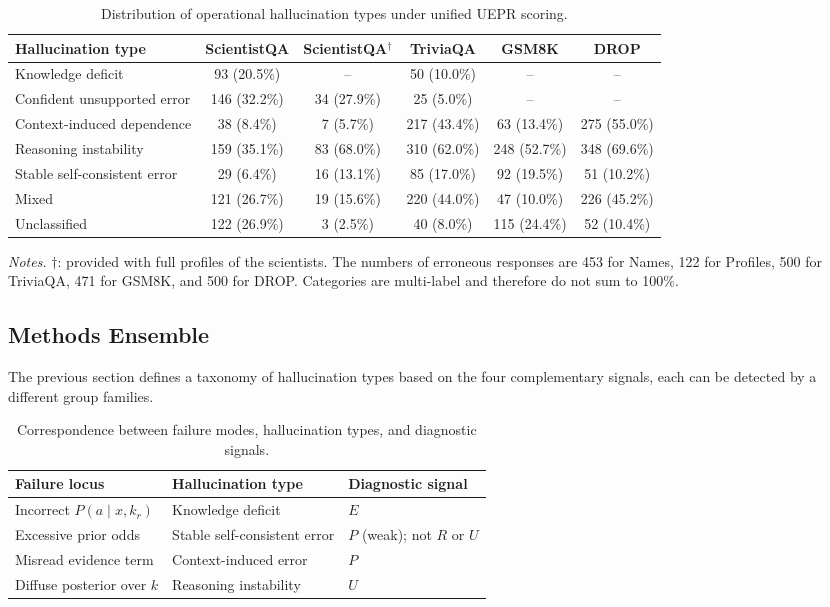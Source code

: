 \begin{table}[t]
\centering
\caption{Distribution of operational hallucination types under unified UEPR scoring.}
\label{tab:unified-hallucination-types}
\small
\setlength{\tabcolsep}{3pt}
\begin{tabular}{lccccc}
\toprule
Hallucination type & ScientistQA & ScientistQA$^\dagger$ & TriviaQA & GSM8K & DROP \\
\midrule
Knowledge deficit
& 93 (20.5\%) & -- & 50 (10.0\%) & -- & -- \\
Confident unsupported error
& 146 (32.2\%) & 34 (27.9\%) & 25 (5.0\%) & -- & -- \\
Context-induced dependence
& 38 (8.4\%) & 7 (5.7\%) & 217 (43.4\%) & 63 (13.4\%) & 275 (55.0\%) \\
Reasoning instability
& 159 (35.1\%) & 83 (68.0\%) & 310 (62.0\%) & 248 (52.7\%) & 348 (69.6\%) \\
Stable self-consistent error
& 29 (6.4\%) & 16 (13.1\%) & 85 (17.0\%) & 92 (19.5\%) & 51 (10.2\%) \\
Mixed
& 121 (26.7\%) & 19 (15.6\%) & 220 (44.0\%) & 47 (10.0\%) & 226 (45.2\%) \\
Unclassified
& 122 (26.9\%) & 3 (2.5\%) & 40 (8.0\%) & 115 (24.4\%) & 52 (10.4\%) \\
\bottomrule
\end{tabular}

\vspace{2pt}
\begin{minipage}{0.98\linewidth}
\footnotesize
\textit{Notes.}
$\dagger$: provided with full profiles of the scientists.  The numbers of erroneous responses are 453 for Names, 122 for Profiles, 500 for TriviaQA, 471 for GSM8K, and 500 for DROP.
Categories are multi-label and therefore do not sum to 100\%.
\end{minipage}
\end{table}

\subsection{Methods Ensemble}
The previous section defines a taxonomy of hallucination types based on the four complementary signals, each can be detected by a different group families.
\begin{table}[t]
\centering
\caption{Correspondence between failure modes, hallucination types, and diagnostic signals.}
\label{tab:failure-mode-diagnostic-signals}
\small
\setlength{\tabcolsep}{8pt}
\begin{tabular}{lll}
\toprule
Failure locus & Hallucination type & Diagnostic signal \\
\midrule
Incorrect $P(a\mid x,k_r)$ & Knowledge deficit & $E$ \\
Excessive prior odds & Stable self-consistent error & $P$ (weak); not $R$ or $U$ \\
Misread evidence term & Context-induced error & $P$ \\
Diffuse posterior over $k$ & Reasoning instability & $U$ \\
\bottomrule
\end{tabular}
\end{table}

